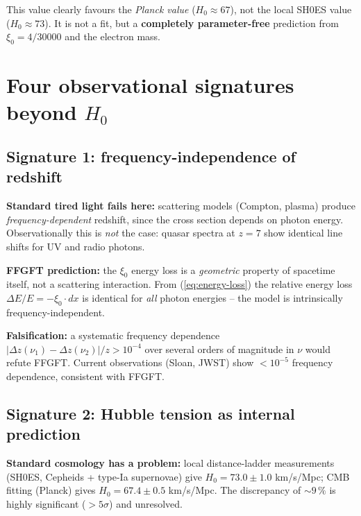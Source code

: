 This value clearly favours the \emph{Planck value} ($H_0 \approx 67$),
not the local SH0ES value ($H_0 \approx 73$). It is not a fit, but a
\textbf{completely parameter-free} prediction from $\xi_0 = 4/30000$
and the electron mass.

\section{\texorpdfstring{Four observational signatures beyond $H_0$}{Four observational signatures beyond H_0}}

\subsection{Signature 1: frequency-independence of redshift}

\textbf{Standard tired light fails here:} scattering models (Compton,
plasma) produce \emph{frequency-dependent} redshift, since the cross
section depends on photon energy. Observationally this is \emph{not}
the case: quasar spectra at $z = 7$ show identical line shifts for UV
and radio photons.

\textbf{FFGFT prediction:} the $\xi_0$ energy loss is a
\emph{geometric} property of spacetime itself, not a scattering
interaction. From (\ref{eq:energy-loss}) the relative energy loss
$\Delta E/E = -\xi_0 \cdot dx$ is identical for \emph{all} photon
energies -- the model is intrinsically frequency-independent.

\textbf{Falsification:} a systematic frequency dependence
$|\Delta z(\nu_1) - \Delta z(\nu_2)| / z > 10^{-4}$ over several
orders of magnitude in $\nu$ would refute FFGFT. Current observations
(Sloan, JWST) show $< 10^{-5}$ frequency dependence, consistent with
FFGFT.

\subsection{Signature 2: Hubble tension as internal prediction}

\textbf{Standard cosmology has a problem:} local distance-ladder
measurements (SH0ES, Cepheids + type-Ia supernovae) give
$H_0 = 73.0 \pm 1.0$ km/s/Mpc; CMB fitting (Planck) gives
$H_0 = 67.4 \pm 0.5$ km/s/Mpc. The discrepancy of $\sim 9\,\%$ is
highly significant ($> 5\sigma$) and unresolved.

